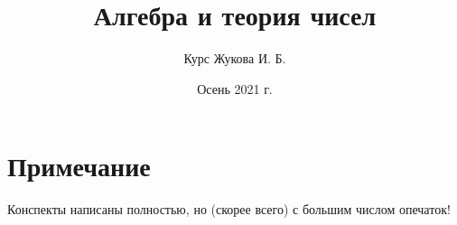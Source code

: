 \documentclass[12pt, a4paper, oneside]{memoir}
\title{Алгебра и теория чисел}
\author{Курс Жукова И. Б.}
\date{Осень 2021 г.}
\begin{document}
\frontmatter

\begin{titlingpage}
    \maketitle
\end{titlingpage}

\section*{Примечание}
Конспекты написаны полностью, но (скорее всего) с большим числом опечаток!
\pagebreak

\tableofcontents
{}


\mainmatter

















\end{document}
